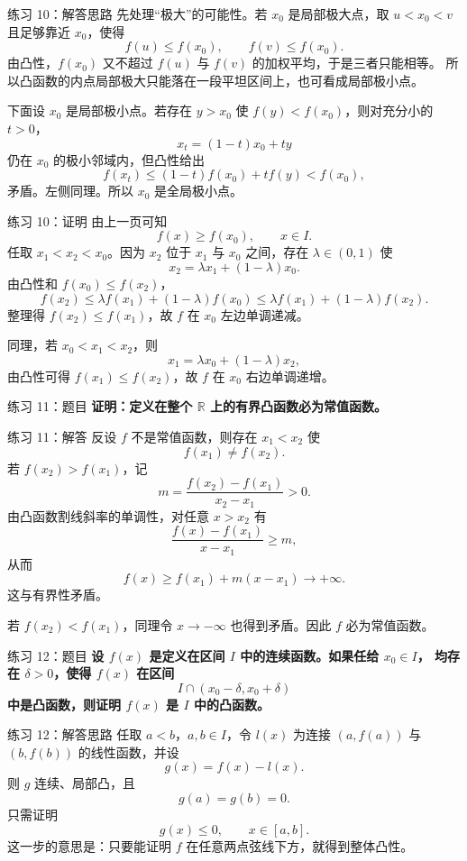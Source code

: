 \documentclass[aspectratio=169,11pt]{ctexbeamer}
\newcommand{\R}{\mathbb{R}}
\begin{document}
\begin{frame}{练习 10：解答思路}
\small
先处理“极大”的可能性。若 $x_0$ 是局部极大点，取 $u<x_0<v$ 且足够靠近
$x_0$，使得
\[
  f(u)\le f(x_0),\qquad f(v)\le f(x_0).
\]
由凸性，$f(x_0)$ 又不超过 $f(u)$ 与 $f(v)$ 的加权平均，于是三者只能相等。
所以凸函数的内点局部极大只能落在一段平坦区间上，也可看成局部极小点。

下面设 $x_0$ 是局部极小点。若存在 $y>x_0$ 使 $f(y)<f(x_0)$，则对充分小的
$t>0$，
\[
  x_t=(1-t)x_0+ty
\]
仍在 $x_0$ 的极小邻域内，但凸性给出
\[
  f(x_t)\le (1-t)f(x_0)+t f(y)<f(x_0),
\]
矛盾。左侧同理。所以 $x_0$ 是全局极小点。
\end{frame}

\begin{frame}{练习 10：证明}
\small
由上一页可知
\[
  f(x)\ge f(x_0),\qquad x\in I.
\]
任取 $x_1<x_2<x_0$。因为 $x_2$ 位于 $x_1$ 与 $x_0$ 之间，存在
$\lambda\in(0,1)$ 使
\[
  x_2=\lambda x_1+(1-\lambda)x_0.
\]
由凸性和 $f(x_0)\le f(x_2)$，
\[
  f(x_2)\le \lambda f(x_1)+(1-\lambda)f(x_0)
  \le \lambda f(x_1)+(1-\lambda)f(x_2).
\]
整理得 $f(x_2)\le f(x_1)$，故 $f$ 在 $x_0$ 左边单调递减。

同理，若 $x_0<x_1<x_2$，则
\[
  x_1=\lambda x_0+(1-\lambda)x_2,
\]
由凸性可得 $f(x_1)\le f(x_2)$，故 $f$ 在 $x_0$ 右边单调递增。
\end{frame}

\begin{frame}{练习 11：题目}
\small
\textbf{证明：定义在整个 $\R$ 上的有界凸函数必为常值函数。}
\end{frame}

\begin{frame}{练习 11：解答}
\small
反设 $f$ 不是常值函数，则存在 $x_1<x_2$ 使
\[
  f(x_1)\ne f(x_2).
\]
若 $f(x_2)>f(x_1)$，记
\[
  m=\frac{f(x_2)-f(x_1)}{x_2-x_1}>0.
\]
由凸函数割线斜率的单调性，对任意 $x>x_2$ 有
\[
  \frac{f(x)-f(x_1)}{x-x_1}\ge m,
\]
从而
\[
  f(x)\ge f(x_1)+m(x-x_1)\to+\infty.
\]
这与有界性矛盾。

若 $f(x_2)<f(x_1)$，同理令 $x\to-\infty$ 也得到矛盾。因此 $f$ 必为常值函数。
\end{frame}

\begin{frame}{练习 12：题目}
\small
\textbf{设 $f(x)$ 是定义在区间 $I$ 中的连续函数。如果任给 $x_0\in I$，
均存在 $\delta>0$，使得 $f(x)$ 在区间}
\[
  I\cap(x_0-\delta,x_0+\delta)
\]
\textbf{中是凸函数，则证明 $f(x)$ 是 $I$ 中的凸函数。}
\end{frame}

\begin{frame}{练习 12：解答思路}
\small
任取 $a<b$，$a,b\in I$，令 $l(x)$ 为连接 $(a,f(a))$ 与 $(b,f(b))$
的线性函数，并设
\[
  g(x)=f(x)-l(x).
\]
则 $g$ 连续、局部凸，且
\[
  g(a)=g(b)=0.
\]
只需证明
\[
  g(x)\le0,\qquad x\in[a,b].
\]
这一步的意思是：只要能证明 $f$ 在任意两点弦线下方，就得到整体凸性。
\end{frame}
\end{document}

